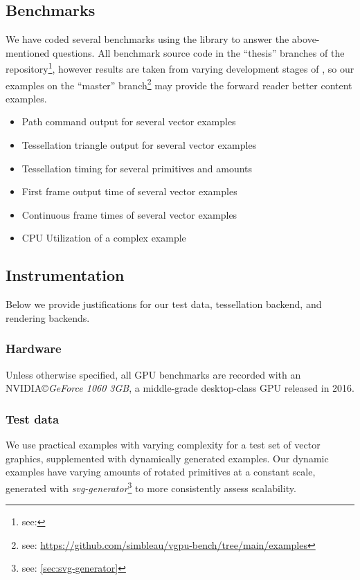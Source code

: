 \subsection{Benchmarks}\label{sec:benchmarks}
We have coded several benchmarks using the \toolname library to answer the above-mentioned questions. All benchmark source code in the ``thesis'' branches of the \toolname repository\footnote{see: \toolrepo}, however results are taken from varying development stages of \toolname, so our examples on the ``master'' branch\footnote{see: \href{https://github.com/simbleau/vgpu-bench/tree/main/examples}{https://github.com/simbleau/vgpu-bench/tree/main/examples}} may provide the forward reader better content examples.

\begin{itemize}
    \item Path command output for several vector examples
    \item Tessellation triangle output for several vector examples
    \item Tessellation timing for several primitives and amounts
    \item First frame output time of several vector examples
    \item Continuous frame times of several vector examples
    \item CPU Utilization of a complex example
\end{itemize}

\subsection{Instrumentation}
Below we provide justifications for our test data, tessellation backend, and rendering backends.

\subsubsection{Hardware}
Unless otherwise specified, all GPU benchmarks are recorded with an NVIDIA\copyright \textit{GeForce 1060 3GB}, a middle-grade desktop-class GPU released in 2016.\medskip

\subsubsection{Test data}
We use practical examples with varying complexity for a test set of vector graphics, supplemented with dynamically generated examples. Our dynamic examples have varying amounts of rotated primitives at a constant scale, generated with \textit{svg-generator}\footnote{see: \cref{sec:svg-generator}} to more consistently assess scalability.\medskip

